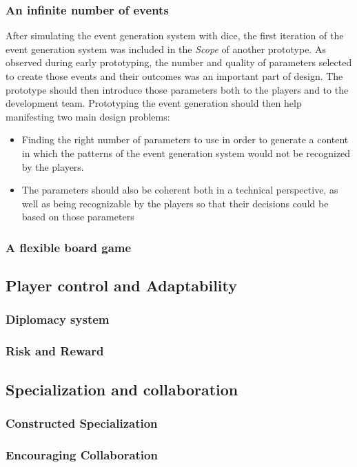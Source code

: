 \subsubsection{An infinite number of events}
After simulating the event generation system with dice, the first iteration of the event generation system was included in the \textit{Scope} of another prototype. As observed during early prototyping, the number and quality of parameters selected to create those events and their outcomes was an important part of design. The prototype should then introduce those parameters both to the players and to the development team. Prototyping the event generation should then help manifesting two main design problems:
\begin{itemize}
\item Finding the right number of parameters to use in order to generate a content in which the patterns of the event generation system would not be recognized by the players.
\item The parameters should also be coherent both in a technical perspective, as well as being recognizable by the players so that their decisions could be based on those parameters
\end{itemize}
\subsubsection{A flexible board game}
\subsection{Player control and Adaptability}
\subsubsection{Diplomacy system}
\subsubsection{Risk and Reward}
\subsection{Specialization and collaboration}
\subsubsection{Constructed Specialization}
\subsubsection{Encouraging Collaboration}

